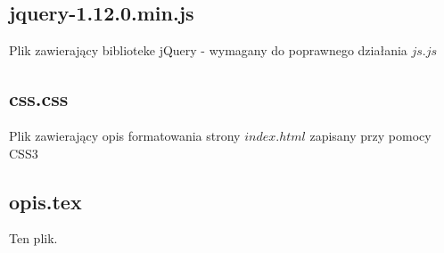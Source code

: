 \documentclass[11pt]{article}
\begin{document}
\subsection{jquery-1.12.0.min.js}
Plik zawierający biblioteke jQuery - wymagany do poprawnego działania $js.js$

\subsection{css.css}
Plik zawierający opis formatowania strony $index.html$ zapisany przy pomocy CSS3

\subsection{opis.tex}
Ten plik.
\end{document}

